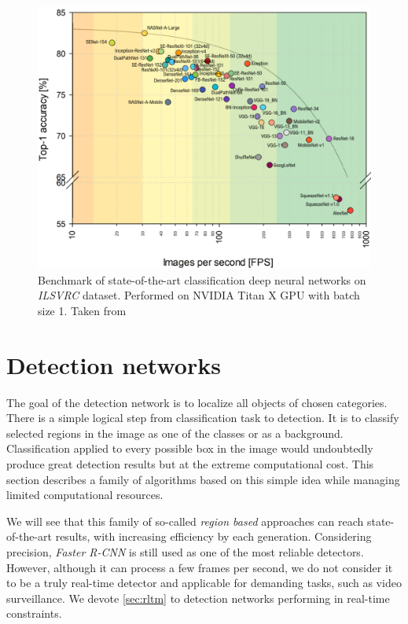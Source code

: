 \begin{figure}
    \includegraphics[width=\textwidth]{img/fps_comp}
    \caption[benchmark of classification CNNs]%
    {Benchmark of state-of-the-art classification deep neural networks on \textit{ILSVRC} dataset. Performed on NVIDIA
Titan X GPU with batch size 1. Taken from \cite[fig. 3]{bib:cnnbenchmark}}
    \label{fig:cnnbenchmark}
\end{figure}



\section{Detection networks}
\label{sec:detnets}
The goal of the detection network is to localize all objects of chosen categories. There is a simple logical step from classification task to detection. It is to classify selected regions in the image as one of the classes or as a background. Classification applied to every possible box in the image would undoubtedly produce great detection results but at the extreme computational cost. This section describes a family of algorithms based on this simple idea while managing limited computational resources.

We will see that this family of so-called \textit{region based} approaches can reach state-of-the-art results, with increasing efficiency by each generation. Considering precision, \textit{Faster R-CNN} is still used as one of the most reliable detectors. However, although it can process a few frames per second, we do not consider it to be a truly real-time detector and applicable for demanding tasks, such as video surveillance. We devote \cref{sec:rltm} to detection networks performing in real-time constraints.

